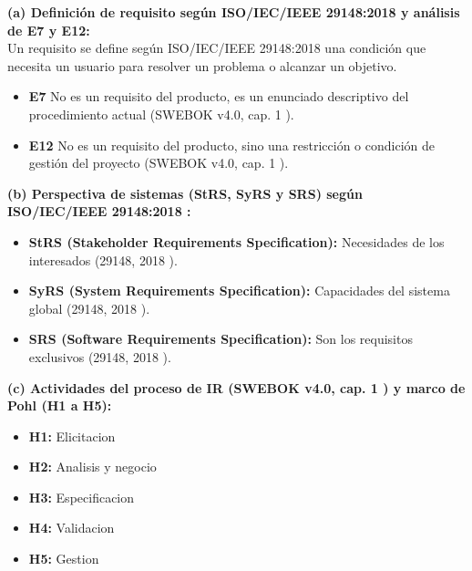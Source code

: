 \documentclass[11pt]{article}
\begin{document}
\begin{cajatarea}[title={T1. Conceptos aplicados al caso \hfill D1 · 10\,\%}]
	\textbf{(a) Definición de requisito según ISO/IEC/IEEE 29148:2018 \citep{iso29148_2018} y análisis de E7 y E12:}\\
	Un requisito se define según ISO/IEC/IEEE 29148:2018 \citep{iso29148_2018} una condición que necesita un usuario para resolver un problema o alcanzar un objetivo.
	\begin{itemize}[leftmargin=18pt,itemsep=2pt]
		\item \textbf{E7} No es un requisito del producto, es un enunciado descriptivo del procedimiento actual (SWEBOK v4.0, cap. 1 \citep{swebok_v4_2024}).
		\item \textbf{E12} No es un requisito del producto, sino una restricción o condición de gestión del proyecto (SWEBOK v4.0, cap. 1 \citep{swebok_v4_2024}).
	\end{itemize}

	\textbf{(b) Perspectiva de sistemas (StRS, SyRS y SRS) según ISO/IEC/IEEE 29148:2018 \citep{iso29148_2018}:}
	\begin{itemize}[leftmargin=18pt,itemsep=2pt]
		\item \textbf{StRS (Stakeholder Requirements Specification):} Necesidades de los interesados (29148, 2018 \citep{iso29148_2018}).
		\item \textbf{SyRS (System Requirements Specification):} Capacidades del sistema global (29148, 2018 \citep{iso29148_2018}).
		\item \textbf{SRS (Software Requirements Specification):} Son los requisitos exclusivos (29148, 2018 \citep{iso29148_2018}).
	\end{itemize}

	\textbf{(c) Actividades del proceso de IR (SWEBOK v4.0, cap. 1 \citep{swebok_v4_2024}) y marco de Pohl \citep{pohl_2025} (H1 a H5):}
	\begin{itemize}[leftmargin=18pt,itemsep=2pt]
		\item \textbf{H1:} Elicitacion \citep{pohl_2025}
		\item \textbf{H2:} Analisis y negocio \citep{pohl_2025}
		\item \textbf{H3:} Especificacion \citep{pohl_2025}
		\item \textbf{H4:} Validacion \citep{pohl_2025}
		\item \textbf{H5:} Gestion \citep{pohl_2025}
	\end{itemize}
\end{cajatarea}
\end{document}
